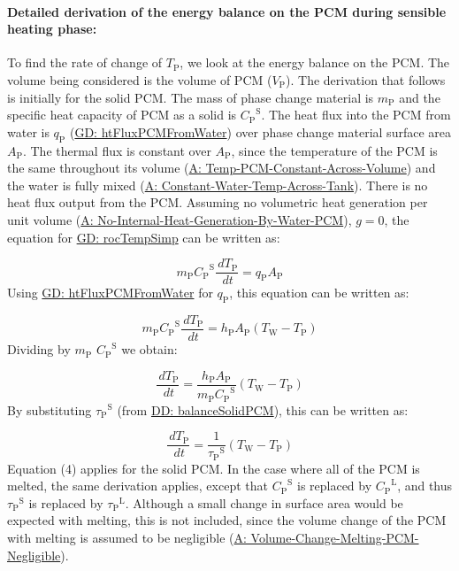 \documentclass[12pt]{article}
\begin{document}
\paragraph{Detailed derivation of the energy balance on the PCM during sensible heating phase:}
\label{IM:eBalanceOnPCMDeriv}
To find the rate of change of ${T_{\text{P}}}$, we look at the energy balance on the PCM. The volume being considered is the volume of PCM (${V_{\text{P}}}$). The derivation that follows is initially for the solid PCM. The mass of phase change material is ${m_{\text{P}}}$ and the specific heat capacity of PCM as a solid is ${{C_{\text{P}}}^{\text{S}}}$. The heat flux into the PCM from water is ${q_{\text{P}}}$ (\hyperref[GD:htFluxPCMFromWater]{GD: htFluxPCMFromWater}) over phase change material surface area ${A_{\text{P}}}$. The thermal flux is constant over ${A_{\text{P}}}$, since the temperature of the PCM is the same throughout its volume (\hyperref[assumpTPCAV]{A: Temp-PCM-Constant-Across-Volume}) and the water is fully mixed (\hyperref[assumpCWTAT]{A: Constant-Water-Temp-Across-Tank}). There is no heat flux output from the PCM. Assuming no volumetric heat generation per unit volume (\hyperref[assumpNIHGBWP]{A: No-Internal-Heat-Generation-By-Water-PCM}), $g=0$, the equation for \hyperref[GD:rocTempSimp]{GD: rocTempSimp} can be written as:

\begin{displaymath}
{m_{\text{P}}} {{C_{\text{P}}}^{\text{S}}} \frac{\,d{T_{\text{P}}}}{\,dt}={q_{\text{P}}} {A_{\text{P}}}
\end{displaymath}
Using \hyperref[GD:htFluxPCMFromWater]{GD: htFluxPCMFromWater} for ${q_{\text{P}}}$, this equation can be written as:

\begin{displaymath}
{m_{\text{P}}} {{C_{\text{P}}}^{\text{S}}} \frac{\,d{T_{\text{P}}}}{\,dt}={h_{\text{P}}} {A_{\text{P}}} \left({T_{\text{W}}}-{T_{\text{P}}}\right)
\end{displaymath}
Dividing by ${m_{\text{P}}}$ ${{C_{\text{P}}}^{\text{S}}}$ we obtain:

\begin{displaymath}
\frac{\,d{T_{\text{P}}}}{\,dt}=\frac{{h_{\text{P}}} {A_{\text{P}}}}{{m_{\text{P}}} {{C_{\text{P}}}^{\text{S}}}} \left({T_{\text{W}}}-{T_{\text{P}}}\right)
\end{displaymath}
By substituting ${{τ_{\text{P}}}^{\text{S}}}$ (from \hyperref[DD:balanceSolidPCM]{DD: balanceSolidPCM}), this can be written as:

\begin{displaymath}
\frac{\,d{T_{\text{P}}}}{\,dt}=\frac{1}{{{τ_{\text{P}}}^{\text{S}}}} \left({T_{\text{W}}}-{T_{\text{P}}}\right)
\end{displaymath}
Equation (4) applies for the solid PCM. In the case where all of the PCM is melted, the same derivation applies, except that ${{C_{\text{P}}}^{\text{S}}}$ is replaced by ${{C_{\text{P}}}^{\text{L}}}$, and thus ${{τ_{\text{P}}}^{\text{S}}}$ is replaced by ${{τ_{\text{P}}}^{\text{L}}}$. Although a small change in surface area would be expected with melting, this is not included, since the volume change of the PCM with melting is assumed to be negligible (\hyperref[assumpVCMPN]{A: Volume-Change-Melting-PCM-Negligible}).
\end{document}
